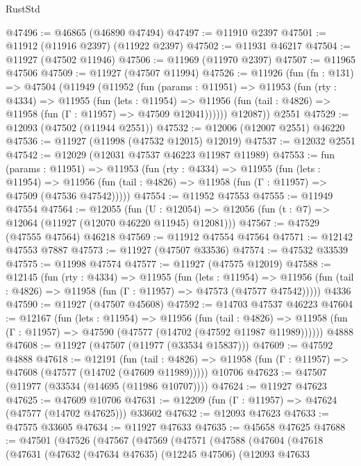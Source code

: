 \begin{lexlean}{RustStd}
\begin{coremodule}
@47496 := @46865 (@46890 @47494)
@47497 := @11910 @2397
@47501 := @11912 (@11916 @2397) (@11922 @2397)
@47502 := @11931 @46217
@47504 := @11927 (@47502 @11946)
@47506 := @11969 (@11970 @2397)
@47507 := @11965 @47506
@47509 := @11927 (@47507 @11994)
@47526 := @11926
    (fun (fn : @131) =>
    @47504
      (@11949
        (@11952
          (fun (params : @11951) =>
          @11953
            (fun (rty : @4334) =>
            @11955
              (fun (lets : @11954) =>
              @11956 (fun (tail : @4826) => @11958 (fun (Γ : @11957) => @47509 @12041))))))
        @12087))
    @2551
@47529 := @12093 (@47502 (@11944 @2551))
@47532 := @12006 (@12007 @2551) @46220
@47536 := @11927 (@11998 (@47532 @12015) @12019)
@47537 := @12032 @2551
@47542 := @12029 (@12031 @47537 @46223 @11987 @11989)
@47553 := fun (params : @11951) =>
  @11953
    (fun (rty : @4334) =>
    @11955
      (fun (lets : @11954) =>
      @11956 (fun (tail : @4826) => @11958 (fun (Γ : @11957) => @47509 (@47536 @47542)))))
@47554 := @11952 @47553
@47555 := @11949 @47554
@47564 := @12055
    (fun (U : @12054) => @12056 (fun (t : @7) => @12064 (@11927 (@12070 @46220 @11945) @12081)))
@47567 := @47529 (@47555 @47564) @46218
@47569 := @11912 @47554 @47564
@47571 := @12142 @47553 @7887
@47573 := @11927 (@47507 @33536)
@47574 := @47532 @33539
@47575 := @11998 @47574
@47577 := @11927 (@47575 @12019)
@47588 := @12145
    (fun (rty : @4334) =>
    @11955
      (fun (lets : @11954) =>
      @11956 (fun (tail : @4826) => @11958 (fun (Γ : @11957) => @47573 (@47577 @47542)))))
    @4336
@47590 := @11927 (@47507 @45608)
@47592 := @14703 @47537 @46223
@47604 := @12167
    (fun (lets : @11954) =>
    @11956
      (fun (tail : @4826) =>
      @11958 (fun (Γ : @11957) => @47590 (@47577 (@14702 (@47592 @11987 @11989))))))
    @4888
@47608 := @11927 (@47507 (@11977 (@33534 @15837)))
@47609 := @47592 @4888
@47618 := @12191
    (fun (tail : @4826) => @11958 (fun (Γ : @11957) => @47608 (@47577 (@14702 (@47609 @11989)))))
    @10706
@47623 := @47507 (@11977 (@33534 (@14695 (@11986 @10707))))
@47624 := @11927 @47623
@47625 := @47609 @10706
@47631 := @12209 (fun (Γ : @11957) => @47624 (@47577 (@14702 @47625))) @33602
@47632 := @12093 @47623
@47633 := @47575 @33605
@47634 := @11927 @47633
@47635 := @45658 @47625
@47688 := @47501
    (@47526
      (@47567
        (@47569
          (@47571
            (@47588
              (@47604
                (@47618
                  (@47631
                    (@47632
                      (@47634 @47635)
                      (@12245 @47506)
                      (@12093
                        @47633

\end{coremodule}
\end{lexlean}
